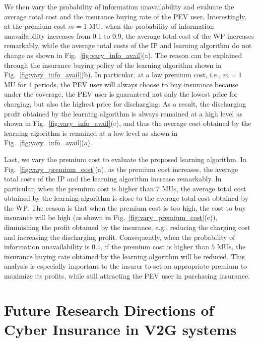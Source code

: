 \documentclass[twocolumn,10pt]{IEEEtran}
\begin{document}
We then vary the probability of information unavailability and evaluate the average total cost and the insurance buying rate of the PEV user. Interestingly, at the premium cost $m=1$ MU, when the probability of information unavailability increases from $0.1$ to $0.9$, the average total cost of the WP increases remarkably, while the average total costs	 of the IP and learning algorithm do not change as shown in Fig.~\ref{fig:vary_info_avail}(a). The reason can be explained through the insurance buying policy of the learning algorithm shown in Fig.~\ref{fig:vary_info_avail}(b). In particular, at a low premium cost, i.e., $m=1$ MU for 4 periods, the PEV user will always choose to buy insurance because under the coverage, the PEV user is guaranteed not only the lowest price for charging, but also the highest price for discharging. As a result, the discharging profit obtained by the learning algorithm is always remained at a high level as shown in Fig.~\ref{fig:vary_info_avail}(c), and thus the average cost obtained by the learning algorithm is remained at a low level as shown in Fig.~\ref{fig:vary_info_avail}(a).

Last, we vary the premium cost to evaluate the proposed learning algorithm. In Fig.~\ref{fig:vary_premium_cost}(a), as the premium cost increases, the average total costs of the IP and the learning algorithm increase remarkably. In particular, when the premium cost is higher than 7 MUs, the average total cost obtained by the learning algorithm is close to the average total cost obtained by the WP. The reason is that when the premium cost is too high, the cost to buy insurance will be high (as shown in Fig.~\ref{fig:vary_premium_cost}(c)), diminishing the profit obtained by the insurance, e.g., reducing the charging cost and increasing the discharging profit. Consequently, when the probability of information unavailability is $0.1$, if the premium cost is higher than $5$ MUs, the insurance buying rate obtained by the learning algorithm will be reduced. This analysis is especially important to the insurer to set an appropriate premium to maximize its profits, while still attracting the PEV user in purchasing insurance.


\section{Future Research Directions of Cyber Insurance in V2G systems}
\label{sec:Future Reserach}
\end{document}
